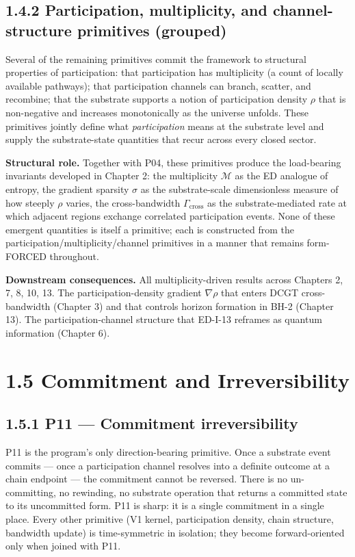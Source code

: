 \documentclass[11pt]{book}
\begin{document}
\subsection{1.4.2 Participation, multiplicity, and channel-structure primitives (grouped)}

Several of the remaining primitives commit the framework to structural properties of participation: that participation has multiplicity (a count of locally available pathways); that participation channels can branch, scatter, and recombine; that the substrate supports a notion of participation density $\rho$ that is non-negative and increases monotonically as the universe unfolds. These primitives jointly define what \textit{participation} means at the substrate level and supply the substrate-state quantities that recur across every closed sector.

\textbf{Structural role.} Together with P04, these primitives produce the load-bearing invariants developed in Chapter 2: the multiplicity $\mathcal{M}$ as the ED analogue of entropy, the gradient sparsity $\sigma$ as the substrate-scale dimensionless measure of how steeply $\rho$ varies, the cross-bandwidth $\Gamma_\mathrm{cross}$ as the substrate-mediated rate at which adjacent regions exchange correlated participation events. None of these emergent quantities is itself a primitive; each is constructed from the participation/multiplicity/channel primitives in a manner that remains form-FORCED throughout.

\textbf{Downstream consequences.} All multiplicity-driven results across Chapters 2, 7, 8, 10, 13. The participation-density gradient $\nabla\rho$ that enters DCGT cross-bandwidth (Chapter 3) and that controls horizon formation in BH-2 (Chapter 13). The participation-channel structure that ED-I-13 reframes as quantum information (Chapter 6).

\section{1.5 Commitment and Irreversibility}

\subsection{1.5.1 P11 — Commitment irreversibility}

P11 is the program's only direction-bearing primitive. Once a substrate event commits — once a participation channel resolves into a definite outcome at a chain endpoint — the commitment cannot be reversed. There is no un-committing, no rewinding, no substrate operation that returns a committed state to its uncommitted form. P11 is sharp: it is a single commitment in a single place. Every other primitive (V1 kernel, participation density, chain structure, bandwidth update) is time-symmetric in isolation; they become forward-oriented only when joined with P11.
\end{document}

